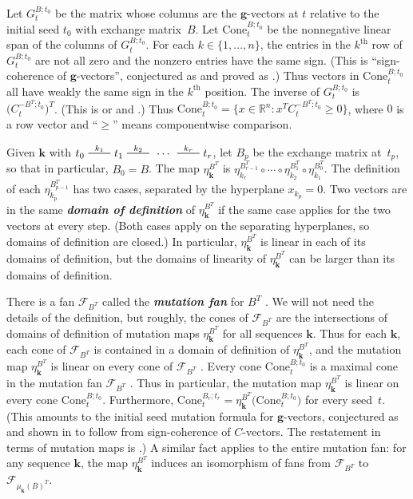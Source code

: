 \documentclass{amsart}
\theoremstyle{definition}
\theoremstyle{remark}
\numberwithin{equation}{section}
\newcommand{\newword}[1]{\textbf{\emph{#1}}}
\newcommand{\reals}{\mathbb R}
\newcommand{\edge}{\,\,\rule[2.7pt]{20pt}{0.5pt}\,\,}
\newcommand{\set}[1]{{\lbrace #1 \rbrace}}
\newcommand{\sett}[1]{{\bigl\lbrace #1 \bigr\rbrace}}
\newcommand{\F}{{\mathcal F}}
\renewcommand{\th}{^\text{th}}
\newcommand{\0}{{\mathbf{0}}}
\newcommand{\Cone}{\mathrm{Cone}}
\newcommand{\g}{\mathbf{g}}
\newcommand{\kk}{{\boldsymbol{k}}}
\renewcommand{\th}{^\text{th}}
\begin{document}
Let $G_t^{B;t_0}$ be the matrix whose columns are the $\g$-vectors at $t$ relative to the initial seed $t_0$ with exchange matrix~$B$.
Let $\Cone^{B;t_0}_t$ be the nonnegative linear span of the columns of $G_t^{B;t_0}$.
For each $k\in\set{1,\ldots,n}$, the entries in the $k\th$ row of $G_t^{B;t_0}$ are not all zero and the nonzero entries have the same sign.
(This is ``sign-coherence of $\g$-vectors'', conjectured as \cite[Conjecture~6.13]{ca4} and proved as \cite[Theorem 5.11]{GHKK}.)
Thus vectors in $\Cone^{B;t_0}_t$ all have weakly the same sign in the $k\th$ position.
The inverse of $G_t^{B;t_0}$ is $\bigl(C_t^{-B^T;t_0}\bigr)^T$.
(This is \cite[Theorem~1.2]{NZ} or \cite[Theorem~1.1]{framework} and \cite[Theorem~3.30]{framework}.)
Thus $\Cone^{B;t_0}_t=\sett{x\in\reals^n:x^TC_t^{-B^T;t_0}\ge0}$, where $0$ is a row vector and ``$\ge$'' means componentwise comparison. 

Given $\kk$ with $t_0\overset{k_1}{\edge}t_1\overset{k_2}{\edge}\,\cdots\,\overset{k_r}{\edge}t_r$, let $B_p$ be the exchange matrix at~$t_p$, so that in particular, $B_0=B$.
The map $\eta_{\kk}^{B^T}$ is ${\eta_{k_r}^{B_{r-1}^T}\circ\cdots\circ\eta_{k_2}^{B_1^T}\circ\eta_{k_1}^{B_0^T}}$.
The definition of each $\eta_{k_p}^{B_{p-1}^T}$ has two cases, separated by the hyperplane $x_{k_p}=0$.
Two vectors are in the same \newword{domain of definition} of $\eta_\kk^{B^T}$ if the same case applies for the two vectors at every step.
(Both cases apply on the separating hyperplanes, so domains of definition are closed.)
In particular, $\eta_\kk^{B^T}$ is linear in each of its domains of definition, but the domains of linearity of $\eta_\kk^{B^T}$ can be larger than its domains of definition.

There is a fan $\F_{B^T}$ called the \newword{mutation fan} for $B^T$ \cite[Definition~5.12]{universal}.
We will not need the details of the definition, but roughly, the cones of $\F_{B^T}$ are the intersections of domains of definition of mutation maps $\eta_\kk^{B^T}$ for all sequences $\kk$.
Thus for each $\kk$, each cone of $\F_{B^T}$ is contained in a domain of definition of $\eta_\kk^{B^T}$, and the mutation map $\eta_\kk^{B^T}$ is linear on every cone of $\F_{B^T}$ \cite[Proposition~5.3]{universal}.
Every cone $\Cone^{B;t_0}_t$ is a maximal cone in the mutation fan $\F_{B^T}$ \cite[Proposition~8.13]{universal}.
Thus in particular, the mutation map $\eta_\kk^{B^T}$ is linear on every cone $\Cone^{B;t_0}_t$.
Furthermore, $\Cone_t^{B_r;t_r}=\eta_\kk^{B^T}\bigl(\Cone_t^{B;t_0}\bigr)$ for every seed~$t$.
(This amounts to the initial seed mutation formula for $\g$-vectors, conjectured as \cite[Conjecture~7.12]{ca4} and shown in \cite[Proposition~4.2(v)]{NZ} to follow from sign-coherence of $C$-vectors.
The restatement in terms of mutation maps is \cite[Conjecture~8.11]{universal}.)
A similar fact applies to the entire mutation fan:
for any sequence $\kk$, the map $\eta_\kk^{B^T}$ induces an isomorphism of fans \cite[Proposition~7.3]{universal} from $\F_{B^T}$ to $\F_{\mu_\kk(B)^T}$.
\end{document}

